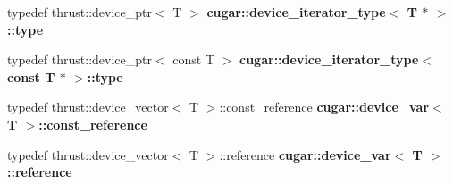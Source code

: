 \begin{DoxyCompactItemize}
typedef thrust\+::device\+\_\+ptr$<$ T $>$ {\bfseries cugar\+::device\+\_\+iterator\+\_\+type$<$ T $\ast$ $>$\+::type}
\item 
\mbox{\label{group___basic_gaee10e06b1c7ca751acf69e8cc41c3c54}} 
typedef thrust\+::device\+\_\+ptr$<$ const T $>$ {\bfseries cugar\+::device\+\_\+iterator\+\_\+type$<$ const T $\ast$ $>$\+::type}
\item 
\mbox{\label{group___basic_ga8ca00c965e35c225ff244024d8576fe5}} 
typedef thrust\+::device\+\_\+vector$<$ T $>$\+::const\+\_\+reference {\bfseries cugar\+::device\+\_\+var$<$ T $>$\+::const\+\_\+reference}
\item 
\mbox{\label{group___basic_ga1caf90bf3409a1cda2f71164d9df61e2}} 
typedef thrust\+::device\+\_\+vector$<$ T $>$\+::reference {\bfseries cugar\+::device\+\_\+var$<$ T $>$\+::reference}
\end{DoxyCompactItemize}
